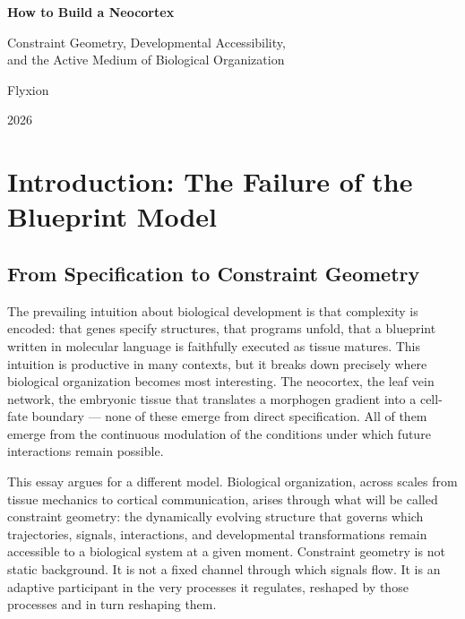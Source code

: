 \documentclass[12pt, a4paper, openany]{book}
\theoremstyle{definition}
\theoremstyle{remark}
\begin{document}

\frontmatter

\begin{titlepage}
\centering
\vspace*{4cm}
{\Huge\bfseries How to Build a Neocortex\par}
\vspace{1.5cm}
{\Large Constraint Geometry, Developmental Accessibility,\\and the Active Medium of Biological Organization\par}
\vspace{3cm}
{\large Flyxion\par}
\vfill
{\normalsize 2026\par}
\end{titlepage}

\tableofcontents

\mainmatter


\chapter*{Introduction: The Failure of the Blueprint Model}

\section*{From Specification to Constraint Geometry}

The prevailing intuition about biological development is that complexity is encoded: that genes specify structures, that programs unfold, that a blueprint written in molecular language is faithfully executed as tissue matures. This intuition is productive in many contexts, but it breaks down precisely where biological organization becomes most interesting. The neocortex, the leaf vein network, the embryonic tissue that translates a morphogen gradient into a cell-fate boundary — none of these emerge from direct specification. All of them emerge from the continuous modulation of the conditions under which future interactions remain possible.

This essay argues for a different model. Biological organization, across scales from tissue mechanics to cortical communication, arises through what will be called constraint geometry: the dynamically evolving structure that governs which trajectories, signals, interactions, and developmental transformations remain accessible to a biological system at a given moment. Constraint geometry is not static background. It is not a fixed channel through which signals flow. It is an adaptive participant in the very processes it regulates, reshaped by those processes and in turn reshaping them.
\end{document}
